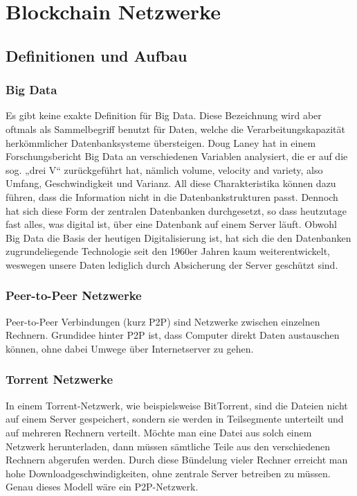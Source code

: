 \chapter{Blockchain Netzwerke}

\section{Definitionen und Aufbau}

\subsection{Big Data}
Es gibt keine exakte Definition für Big Data. Diese Bezeichnung wird aber oftmals als Sammelbegriff benutzt für Daten, welche die Verarbeitungskapazität herkömmlicher Datenbanksysteme übersteigen.
Doug Laney hat in einem Forschungsbericht Big Data an verschiedenen Variablen analysiert, die er auf die sog. „drei V“ zurückgeführt hat, nämlich volume, velocity and variety, also Umfang, Geschwindigkeit und Varianz. All diese Charakteristika können dazu führen, dass die Information nicht in die Datenbankstrukturen passt.
Dennoch hat sich diese Form der zentralen Datenbanken durchgesetzt, so dass heutzutage fast alles, was digital ist, über eine Datenbank auf einem Server läuft.
Obwohl Big Data die Basis der heutigen Digitalisierung ist, hat sich die den Datenbanken zugrundeliegende Technologie seit den 1960er Jahren kaum weiterentwickelt, weswegen unsere Daten lediglich durch Absicherung der Server geschützt sind.
\subsection{Peer-to-Peer Netzwerke}
Peer-to-Peer Verbindungen (kurz P2P) sind Netzwerke zwischen einzelnen Rechnern. Grundidee hinter P2P ist, dass Computer direkt Daten austauschen können, ohne dabei Umwege über Internetserver zu gehen.
\subsection{Torrent Netzwerke}
In einem Torrent-Netzwerk, wie beispielsweise BitTorrent, sind die Dateien nicht auf einem Server gespeichert, sondern sie werden in Teilsegmente unterteilt und auf mehreren Rechnern verteilt. Möchte man eine Datei aus solch einem Netzwerk herunterladen, dann müssen sämtliche Teile aus den verschiedenen Rechnern abgerufen werden. Durch diese Bündelung vieler Rechner erreicht man hohe Downloadgeschwindigkeiten, ohne zentrale Server betreiben zu müssen. Genau dieses Modell wäre ein P2P-Netzwerk.
